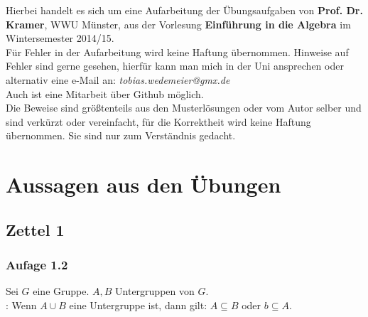 \maketitle
\thispagestyle{empty}
\newpage
	
\thispagestyle{empty}
\vspace*{\fill}
\begin{center}
	Hierbei handelt es sich um eine Aufarbeitung der Übungsaufgaben von \textbf{Prof. Dr. Kramer}, WWU Münster, aus der Vorlesung \textbf{Einführung in die Algebra} im Wintersemester 2014/15.\\
	\vspace{2cm}
	Für Fehler in der Aufarbeitung wird keine Haftung übernommen. Hinweise auf Fehler sind gerne gesehen, hierfür kann man mich in der Uni ansprechen oder alternativ eine e-Mail an: \textit{tobias.wedemeier@gmx.de}\\
	Auch ist eine Mitarbeit über Github möglich.\\
	\vspace{2cm}
	Die Beweise sind größtenteils aus den Musterlösungen oder vom Autor selber und sind verkürzt oder vereinfacht, für die Korrektheit wird keine Haftung übernommen. Sie sind nur zum Verständnis gedacht.
\end{center}
\vspace*{\fill}
\newpage
	
	
\tableofcontents
\cleardoubleoddemptypage %
	
\setcounter{page}{1}

\section{Aussagen aus den Übungen}
\label{sec:übungenalg}

\subsection{Zettel 1}
\label{sub:zettel_1alg}
\subsubsection{Aufage 1.2}
Sei $G$ eine Gruppe. $A,B$ Untergruppen von $G$.\\
\zz: Wenn $A\cup B$ eine Untergruppe ist, dann gilt: $A\subseteq B$ oder $b\subseteq A$.\\

